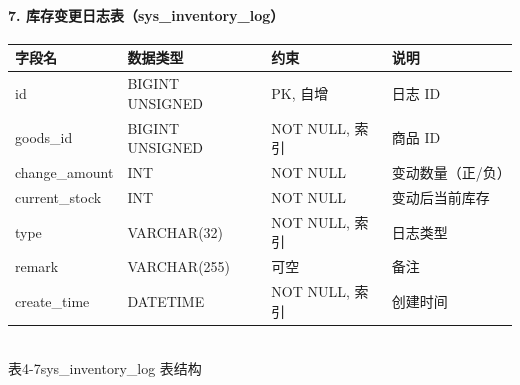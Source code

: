 \paragraph{7. 库存变更日志表（sys\_inventory\_log）}
\begin{center}
  \renewcommand{\arraystretch}{1.4}
  \begin{tabular}{|>{\centering\arraybackslash}m{2.5cm}|>{\centering\arraybackslash}m{3.2cm}|>{\centering\arraybackslash}m{4.4cm}|>{\centering\arraybackslash}m{3.5cm}|}
    \hline
    \textbf{字段名}   & \textbf{数据类型}   & \textbf{约束}  & \textbf{说明} \\ \hline
    id             & BIGINT UNSIGNED & PK, 自增       & 日志 ID       \\ \hline
    goods\_id      & BIGINT UNSIGNED & NOT NULL, 索引 & 商品 ID       \\ \hline
    change\_amount & INT             & NOT NULL     & 变动数量（正/负）   \\ \hline
    current\_stock & INT             & NOT NULL     & 变动后当前库存     \\ \hline
    type           & VARCHAR(32)     & NOT NULL, 索引 & 日志类型        \\ \hline
    remark         & VARCHAR(255)    & 可空           & 备注          \\ \hline
    create\_time   & DATETIME        & NOT NULL, 索引 & 创建时间        \\ \hline
  \end{tabular}
  \\[0.3em]
  {表4-7\quad sys\_inventory\_log 表结构}
\end{center}

